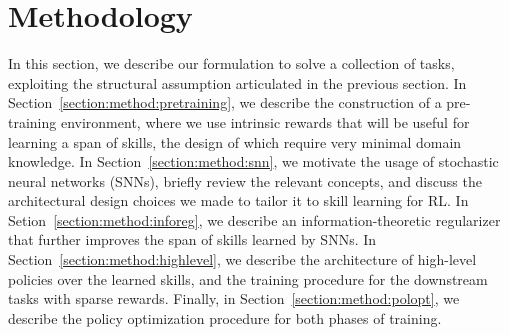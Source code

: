 \documentclass{article} %
\begin{document}

\section{Methodology}
\label{sec:method}

In this section, we describe our formulation to solve a collection of tasks, exploiting the structural assumption articulated in the previous section. In Section~\ref{section:method:pretraining}, we describe the construction of a pre-training environment, where we use intrinsic rewards that will be useful for learning a span of skills, the design of which require very minimal domain knowledge. In Section~\ref{section:method:snn}, we motivate the usage of stochastic neural networks (SNNs), briefly review the relevant concepts, and discuss the architectural design choices we made to tailor it to skill learning for RL. 
In Setion~\ref{section:method:inforeg}, we describe an information-theoretic regularizer that further improves the span of skills learned by SNNs. In Section~\ref{section:method:highlevel}, we describe the architecture of high-level policies over the learned skills, and the training procedure for the downstream tasks with sparse rewards. Finally, in Section~\ref{section:method:polopt}, we describe the policy optimization procedure for both phases of training.%
\end{document}
